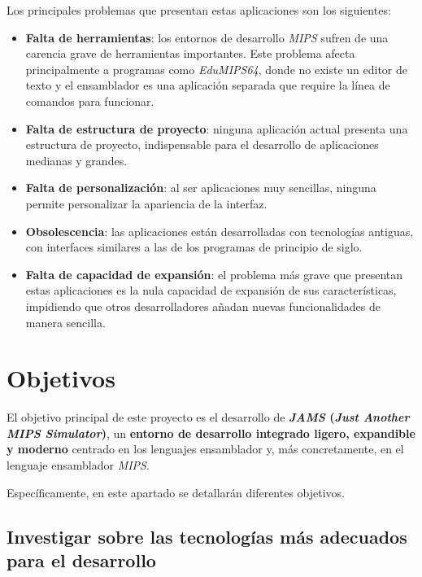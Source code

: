 \noindent Los principales problemas que presentan estas aplicaciones son los siguientes:
\begin{itemize}
    \item \textbf{Falta de herramientas}: los entornos de desarrollo \textit{MIPS} sufren de una
    carencia grave de herramientas importantes.
    Este problema afecta principalmente a programas como \textit{EduMIPS64}, donde no existe un editor de texto y
    el ensamblador es una aplicación separada que require la línea de comandos para funcionar.
    \item \textbf{Falta de estructura de proyecto}: ninguna aplicación actual presenta una estructura
    de proyecto, indispensable para el desarrollo de aplicaciones medianas y grandes.
    \item \textbf{Falta de personalización}: al ser aplicaciones muy sencillas, ninguna permite
    personalizar la apariencia de la interfaz.
    \item \textbf{Obsolescencia}: las aplicaciones están desarrolladas con tecnologías antiguas,
    con interfaces similares a las de los programas de principio de siglo.
    \item \textbf{Falta de capacidad de expansión}: el problema más grave que presentan estas aplicaciones
    es la nula capacidad de expansión de sus características, impidiendo que otros desarrolladores
    añadan nuevas funcionalidades de manera sencilla.
\end{itemize}


\section{Objetivos}\label{sec:objetivos}

El objetivo principal de este proyecto es el desarrollo de \textbf{\textit{JAMS}
(\textit{Just Another MIPS Simulator})}, un \textbf{entorno de desarrollo integrado ligero, expandible y moderno}
centrado en los lenguajes ensamblador y, más concretamente, en el lenguaje ensamblador \textit{MIPS}.

\noindent Específicamente, en este apartado se detallarán diferentes objetivos.

\subsection{Investigar sobre las tecnologías más adecuados para el desarrollo}
\label{subsec:investigar-sobre-las-tecnologias-mas-adecuados-para-el-desarrollo}

